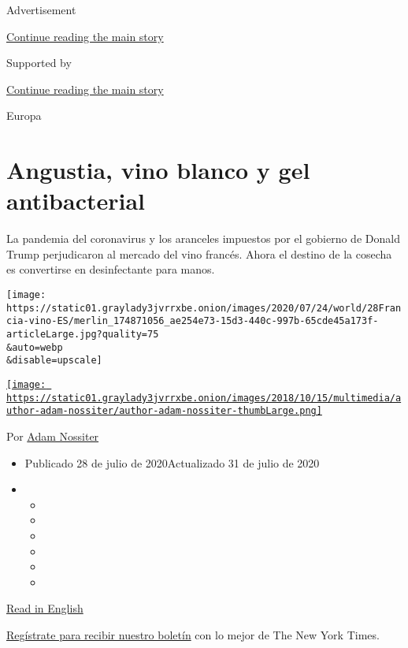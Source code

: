 Advertisement

\protect\hyperlink{after-top}{Continue reading the main story}

Supported by

\protect\hyperlink{after-sponsor}{Continue reading the main story}

Europa

\hypertarget{angustia-vino-blanco-y-gel-antibacterial}{%
\section{Angustia, vino blanco y gel
antibacterial}\label{angustia-vino-blanco-y-gel-antibacterial}}

La pandemia del coronavirus y los aranceles impuestos por el gobierno de
Donald Trump perjudicaron al mercado del vino francés. Ahora el destino
de la cosecha es convertirse en desinfectante para manos.

\texttt{[image: https://static01.graylady3jvrrxbe.onion/images/2020/07/24/world/28Francia-vino-ES/merlin\_174871056\_ae254e73-15d3-440c-997b-65cde45a173f-articleLarge.jpg?quality=75\\\&auto=webp\\\&disable=upscale]}

\href{https://www.nytimes3xbfgragh.onion/by/adam-nossiter}{\texttt{[image: https://static01.graylady3jvrrxbe.onion/images/2018/10/15/multimedia/author-adam-nossiter/author-adam-nossiter-thumbLarge.png]}}

Por \href{https://www.nytimes3xbfgragh.onion/by/adam-nossiter}{Adam
Nossiter}

\begin{itemize}
\item
  Publicado 28 de julio de 2020Actualizado 31 de julio de 2020
\item
  \begin{itemize}
  \item
  \item
  \item
  \item
  \item
  \item
  \end{itemize}
\end{itemize}

\href{https://www.nytimes3xbfgragh.onion/2020/07/27/world/europe/france-alsace-wine-coronavirus.html}{Read
in English}

\href{https://www.nytimes3xbfgragh.onion/newsletters/el-times}{Regístrate
para recibir nuestro boletín} con lo mejor de The New York Times.

